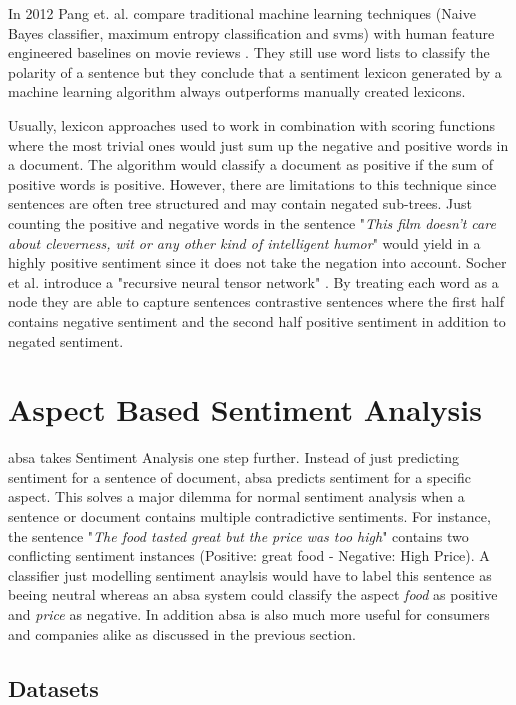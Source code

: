In 2012 Pang et. al. compare traditional machine learning techniques {(Naive Bayes classifier, maximum entropy classification and \glspl{svm})} with human feature engineered baselines on movie reviews \cite{Pang2012}. They still use word lists to classify the polarity of a sentence but they conclude that a sentiment lexicon generated by a machine learning algorithm always outperforms manually created lexicons.
\medskip


Usually, lexicon approaches used to work in combination with scoring functions where the most trivial ones would just sum up the negative and positive words in a document. The algorithm would classify a document as positive if the sum of positive words is positive. However, there are limitations to this technique since sentences are often tree structured and may contain negated sub-trees. Just counting the positive and negative words in the sentence "\textit{This film doesn't care about cleverness, wit or any other kind of intelligent humor}" would yield in a highly positive sentiment since it does not take the negation into account. Socher et al. introduce a "recursive neural tensor network" \cite{Socher2013}. By treating each word as a node they are able to capture sentences contrastive sentences where the first half contains negative sentiment and the second half positive sentiment in addition to negated sentiment.
\medskip

\section{Aspect Based Sentiment Analysis}
\label{sec:02_absa}

\acrfull{absa} takes Sentiment Analysis one step further. Instead of just predicting sentiment for a sentence of document, \gls{absa} predicts sentiment for a specific aspect. This solves a major dilemma for normal sentiment analysis when a sentence or document contains multiple contradictive sentiments. For instance, the sentence "\textit{The food tasted great but the price was too high}" contains two conflicting sentiment instances {(Positive: great food - Negative: High Price)}. A classifier just modelling sentiment anaylsis would have to label this sentence as beeing neutral whereas an \gls{absa} system could classify the aspect \textit{food} as positive and \textit{price} as negative. In addition \gls{absa} is also much more useful for consumers and companies alike as discussed in the previous section.
\medskip

\subsection*{Datasets}

